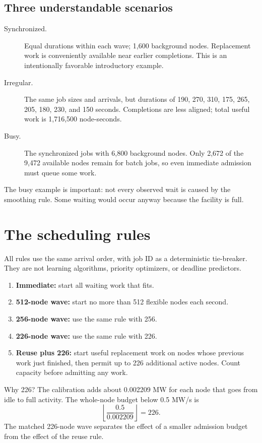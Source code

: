 \documentclass[11pt]{article}
\begin{document}
\subsection{Three understandable scenarios}

\begin{description}
\item[Synchronized.] Equal durations within each wave; 1,600 background
nodes. Replacement work is conveniently available near earlier completions.
This is an intentionally favorable introductory example.
\item[Irregular.] The same job sizes and arrivals, but durations of
190, 270, 310, 175, 265, 205, 180, 230, and 150 seconds.
Completions are less aligned; total useful work is 1,716,500 node-seconds.
\item[Busy.] The synchronized jobs with 6,800 background nodes. Only
2,672 of the 9,472 available nodes remain for batch jobs, so even
immediate admission must queue some work.
\end{description}

The busy example is important: not every observed wait is caused by the
smoothing rule. Some waiting would occur anyway because the facility is full.

\section{The scheduling rules}

All rules use the same arrival order, with job ID as a deterministic tie-breaker.
They are not learning algorithms, priority optimizers, or deadline predictors.

\begin{enumerate}
\item \textbf{Immediate:} start all waiting work that fits.
\item \textbf{512-node wave:} start no more than 512 flexible nodes each second.
\item \textbf{256-node wave:} use the same rule with 256.
\item \textbf{226-node wave:} use the same rule with 226.
\item \textbf{Reuse plus 226:} start useful replacement work on nodes
whose previous work just finished, then permit up to 226 additional
active nodes. Count capacity before admitting any work.
\end{enumerate}

Why 226? The calibration adds about 0.002209 MW for each node that goes
from idle to full activity. The whole-node budget below 0.5 MW/s is
\[
\left\lfloor\frac{0.5}{0.002209}\right\rfloor=226.
\]
The matched 226-node wave separates the effect of a smaller admission
budget from the effect of the reuse rule.
\end{document}
